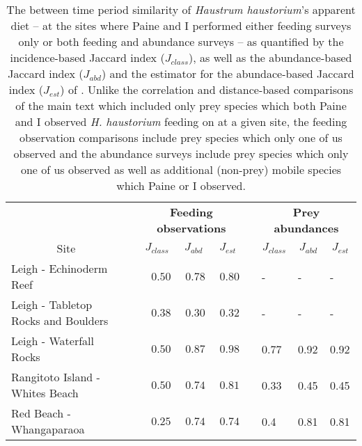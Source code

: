 \begin{table}[!tbp]
\caption{The between time period similarity of
  \textit{Haustrum haustorium}'s apparent diet 
  -- at the sites where Paine and I performed either feeding surveys only
  or both feeding and abundance surveys --
  as quantified by 
  the incidence-based Jaccard index ($J_{class}$), as well as
  the abundance-based Jaccard index ($J_{abd}$) and
  the estimator for the abundace-based Jaccard index ($J_{est}$) 
  of \citet{Chao:2005tf}.
  Unlike the correlation and distance-based comparisons of the main text which
  included only prey species which both Paine and I observed 
  \textit{H. haustorium} feeding on at a given site,
  the feeding observation comparisons include prey species which only one of us observed
  and the abundance surveys include prey species which only one of us observed as well 
  as additional (non-prey) mobile species which Paine or I observed.\label{tab:Jnobsabund}} 
{\centering
\begin{tabular}{lcrrrclll}
\hline
\multicolumn{1}{c}{\bfseries }&\multicolumn{1}{c}{\bfseries }&\multicolumn{3}{c}{\bfseries Feeding observations}&\multicolumn{1}{c}{\bfseries }&\multicolumn{3}{c}{\bfseries Prey abundances}\tabularnewline
\cline{3-5} \cline{7-9}
\multicolumn{1}{c}{Site}&\multicolumn{1}{c}{}&\multicolumn{1}{c}{$J_{class}$}&\multicolumn{1}{c}{$J_{abd}$}&\multicolumn{1}{c}{$J_{est}$}&\multicolumn{1}{c}{}&\multicolumn{1}{c}{$J_{class}$}&\multicolumn{1}{c}{$J_{abd}$}&\multicolumn{1}{c}{$J_{est}$}\tabularnewline
\hline
Leigh - Echinoderm Reef&&$0.50$&$0.78$&$0.80$&&-&-&-\tabularnewline
Leigh - Tabletop Rocks and Boulders&&$0.38$&$0.30$&$0.32$&&-&-&-\tabularnewline
Leigh - Waterfall Rocks&&$0.50$&$0.87$&$0.98$&&0.77&0.92&0.92\tabularnewline
Rangitoto Island - Whites Beach&&$0.50$&$0.74$&$0.81$&&0.33&0.45&0.45\tabularnewline
Red Beach - Whangaparaoa&&$0.25$&$0.74$&$0.74$&&0.4&0.81&0.81\tabularnewline
\hline
\end{tabular}}
\end{table}
